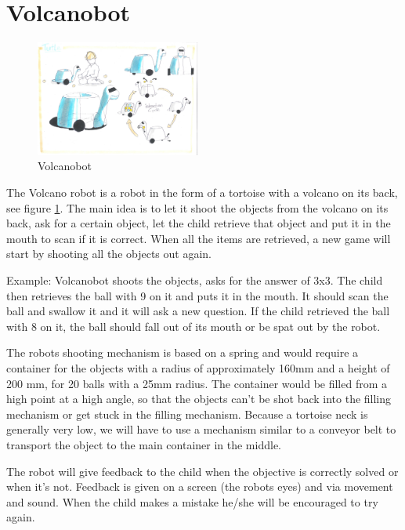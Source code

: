 \documentclass[11pt,twoside,a4paper]{report}
\begin{document}
\section{Volcanobot}
\begin{figure}
  \begin{center}
    \includegraphics[width=0.48\textwidth]{Images/VolcanoBotConcept.pdf}
  \end{center}
  \caption{Volcanobot}
  \label{figure:volcanobot}
\end{figure}
The Volcano robot is a robot in the form of a tortoise with a volcano on its back, see figure \ref{figure:volcanobot}. The main idea is to let it shoot the objects from the volcano on its back, ask for a certain object, let the child retrieve that object and put it in the mouth to scan if it is correct. When all the items are retrieved, a new game will start by shooting all the objects out again.

Example: Volcanobot shoots the objects, asks for the answer of 3x3. The child then retrieves the ball with 9 on it and puts it in the mouth. It should scan the ball and swallow it and it will ask a new question. If the child retrieved the ball with 8 on it, the ball should fall out of its mouth or be spat out by the robot.

The robots shooting mechanism is based on a spring and would require a container for the objects with a radius of approximately 160mm and a height of 200 mm, for 20 balls with a 25mm radius. The container would be filled from a high point at a high angle, so that the objects can't be shot back into the filling mechanism or get stuck in the filling mechanism. Because a tortoise neck is generally very low, we will have to use a mechanism similar to a conveyor belt to transport the object to the main container in the middle.

The robot will give feedback to the child when the objective is correctly solved or when it’s not. Feedback is given on a screen (the robots eyes) and via movement and sound. When the child makes a mistake he/she will be encouraged to try again.
\end{document}
